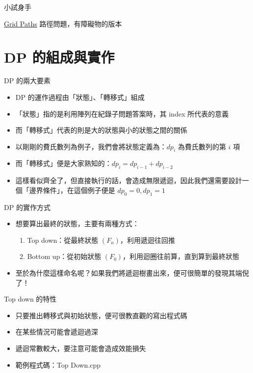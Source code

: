 \documentclass[aspectratio=169]{beamer}
\begin{document}
    \begin{frame}{小試身手}
        \begin{block}{\href{https://cses.fi/problemset/task/1638}{Grid Paths}}
            路徑問題，有障礙物的版本
        \end{block}
    \end{frame}

    \section{DP 的組成與實作}

    \begin{frame}{DP 的兩大要素}
        \begin{itemize}
            \item<1-> DP 的運作過程由「狀態」、「轉移式」組成
            \item<2-> 「狀態」指的是利用陣列在紀錄子問題答案時，其 index 所代表的意義
            \item<2-> 而「轉移式」代表的則是大的狀態與小的狀態之間的關係
            \item<3-> 以剛剛的費氏數列為例子，我們會將狀態定義為：$dp_i$ 為費氏數列的第 $i$ 項
            \item<3-> 而「轉移式」便是大家熟知的：$dp_i = dp_{i - 1} + dp_{i - 2}$
            \item<4-> 這樣看似齊全了，但直接執行的話，會造成無限遞迴，因此我們還需要設計一個「邊界條件」，在這個例子便是 $dp_0 = 0, dp_1 = 1$
        \end{itemize}
    \end{frame}


    \begin{frame}{DP 的實作方式}
        \begin{itemize}
            \item 想要算出最終的狀態，主要有兩種方式：
            \begin{enumerate}
                \item Top down：從最終狀態 $(F_n)$，利用遞迴往回推
                \item Bottom up：從初始狀態 $(F_0)$，利用迴圈往前算，直到算到最終狀態
            \end{enumerate}
            \item 至於為什麼這樣命名呢？如果我們將遞迴樹畫出來，便可很簡單的發現其端倪了！
        \end{itemize}
    \end{frame}
    
    \begin{frame}{Top down 的特性}
        \begin{itemize}
            \item 只要推出轉移式與初始狀態，便可很教直觀的寫出程式碼
            \item 在某些情況可能會遞迴過深
            \item 遞迴常數較大，要注意可能會造成效能損失
            \item 範例程式碼：Top Down.cpp
        \end{itemize}
    \end{frame}
\end{document}
